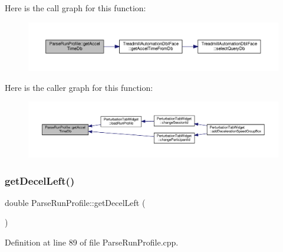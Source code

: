Here is the call graph for this function\+:
\nopagebreak
\begin{figure}[H]
\begin{center}
\leavevmode
\includegraphics[width=350pt]{class_parse_run_profile_a94a349a23a034367a6bdf770a8e4514b_cgraph}
\end{center}
\end{figure}
Here is the caller graph for this function\+:
\nopagebreak
\begin{figure}[H]
\begin{center}
\leavevmode
\includegraphics[width=350pt]{class_parse_run_profile_a94a349a23a034367a6bdf770a8e4514b_icgraph}
\end{center}
\end{figure}
\mbox{\label{class_parse_run_profile_a7ce3d630a0ea5925525ee902f25d44e1}} 
\subsubsection{\texorpdfstring{get\+Decel\+Left()}{getDecelLeft()}}
{\footnotesize\ttfamily double Parse\+Run\+Profile\+::get\+Decel\+Left (\begin{DoxyParamCaption}{ }\end{DoxyParamCaption})}



Definition at line 89 of file Parse\+Run\+Profile.\+cpp.

